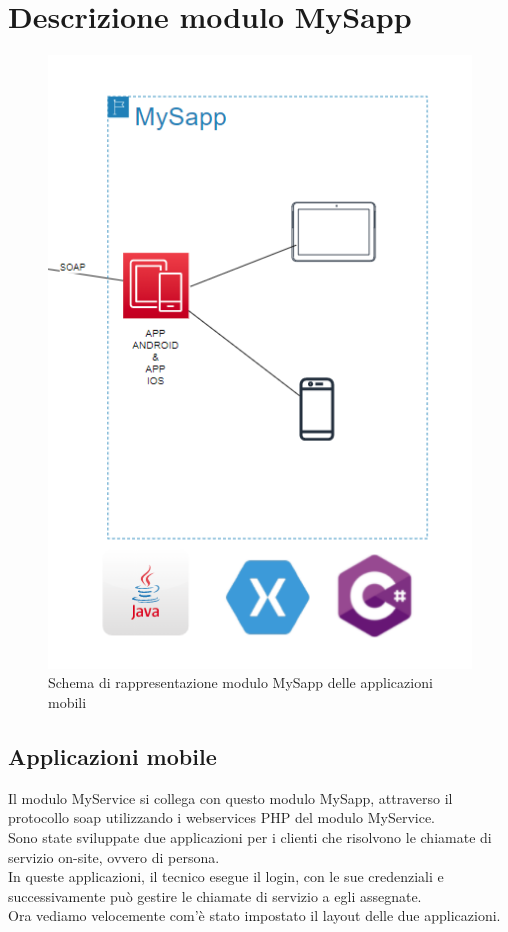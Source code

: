 \section{Descrizione modulo MySapp}
\begin{figure}[!h] 
	\centering 
	\includegraphics[scale = 1.1]{immagini/modulo-mysapp.png} 
	\caption{Schema di rappresentazione modulo MySapp delle applicazioni mobili}
\end{figure}
\newpage
\subsection{Applicazioni mobile}
Il modulo MyService si collega con questo modulo MySapp, attraverso il protocollo \gls{soap} utilizzando i webservices PHP del modulo MyService.\\
Sono state sviluppate due applicazioni per i clienti che risolvono le chiamate di servizio on-site, ovvero di persona.\\
In queste applicazioni, il tecnico esegue il login, con le sue credenziali e successivamente può gestire le chiamate di servizio a egli assegnate.\\
Ora vediamo velocemente com'è stato impostato il layout delle due applicazioni.
